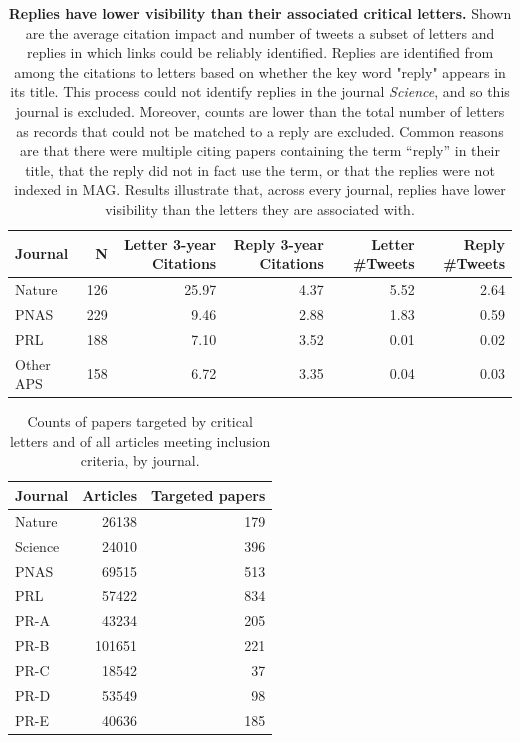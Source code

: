 \documentclass[12pt]{article} %
\begin{document}
\clearpage
\begin{landscape}
\begin{table}[p]
\centering
\caption{
  \textbf{Replies have lower visibility than their associated critical letters.}
  Shown are the average citation impact and number of tweets a subset of letters and replies in which links could be reliably identified. 
  Replies are identified from among the citations to letters based on whether the key word "reply" appears in its title. 
  This process could not identify replies in the journal \textit{Science}, and so this journal is excluded. 
  Moreover, counts are lower than the total number of letters as records that could not be matched to a reply are excluded.
  Common reasons are that there were multiple citing papers containing the term ``reply'' in their title, that the reply did not in fact use the term, or that the replies were not indexed in MAG. 
  Results illustrate that, across every journal, replies have lower visibility than the letters they are associated with.
}
\label{si:tab:letters-and-replies-visibility}
\begin{tabular}{lrrrrr}
  \toprule
Journal & N & Letter 3-year Citations & Reply 3-year Citations & Letter \#Tweets & Reply \#Tweets \\ 
  \midrule
Nature & 126 & 25.97 & 4.37 & 5.52 & 2.64 \\ 
  PNAS & 229 & 9.46 & 2.88 & 1.83 & 0.59 \\ 
  PRL & 188 & 7.10 & 3.52 & 0.01 & 0.02 \\ 
  Other APS & 158 & 6.72 & 3.35 & 0.04 & 0.03 \\ 
   \bottomrule
\end{tabular}
\end{table}
\end{landscape}
\clearpage

\begin{table}[p]
\centering
\caption{Counts of papers targeted by critical letters and of all articles meeting inclusion criteria, by journal.}
\label{si:tab:counts}
\begin{tabular}{lrr}
  \toprule
Journal & Articles & Targeted papers \\ 
  \midrule
Nature & 26138 & 179 \\ 
  Science & 24010 & 396 \\ 
  PNAS & 69515 & 513 \\ 
  PRL & 57422 & 834 \\ 
  PR-A & 43234 & 205 \\ 
  PR-B & 101651 & 221 \\ 
  PR-C & 18542 & 37 \\ 
  PR-D & 53549 & 98 \\ 
  PR-E & 40636 & 185 \\ 
   \bottomrule
\end{tabular}
\end{table}
\end{document}
